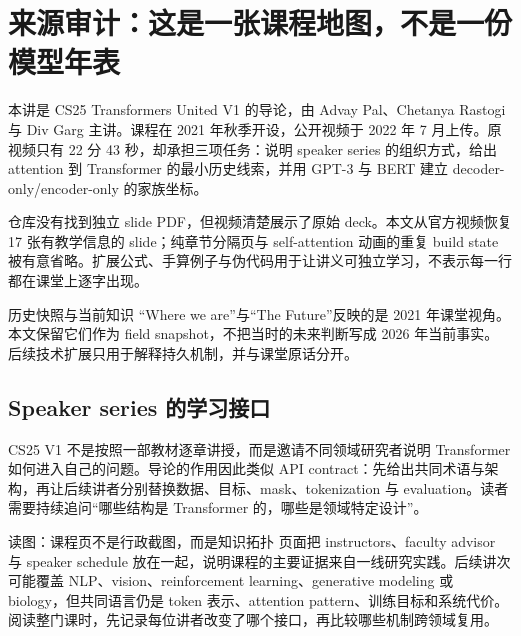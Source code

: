 \section{来源审计：这是一张课程地图，不是一份模型年表}

本讲是 CS25 Transformers United V1 的导论，由 Advay Pal、Chetanya Rastogi 与 Div Garg 主讲。课程在 2021 年秋季开设，公开视频于 2022 年 7 月上传。原视频只有 22 分 43 秒，却承担三项任务：说明 speaker series 的组织方式，给出 attention 到 Transformer 的最小历史线索，并用 GPT-3 与 BERT 建立 decoder-only/encoder-only 的家族坐标。

仓库没有找到独立 slide PDF，但视频清楚展示了原始 deck。本文从官方视频恢复 17 张有教学信息的 slide；纯章节分隔页与 self-attention 动画的重复 build state 被有意省略。扩展公式、手算例子与伪代码用于让讲义可独立学习，不表示每一行都在课堂上逐字出现。

\begin{warningbox}{历史快照与当前知识}
“Where we are”与“The Future”反映的是 2021 年课堂视角。本文保留它们作为 field snapshot，不把当时的未来判断写成 2026 年当前事实。后续技术扩展只用于解释持久机制，并与课堂原话分开。
\end{warningbox}

\subsection{Speaker series 的学习接口}

CS25 V1 不是按照一部教材逐章讲授，而是邀请不同领域研究者说明 Transformer 如何进入自己的问题。导论的作用因此类似 API contract：先给出共同术语与架构，再让后续讲者分别替换数据、目标、mask、tokenization 与 evaluation。读者需要持续追问“哪些结构是 Transformer 的，哪些是领域特定设计”。


\begin{knowledgebox}{读图：课程页不是行政截图，而是知识拓扑}
页面把 instructors、faculty advisor 与 speaker schedule 放在一起，说明课程的主要证据来自一线研究实践。后续讲次可能覆盖 NLP、vision、reinforcement learning、generative modeling 或 biology，但共同语言仍是 token 表示、attention pattern、训练目标和系统代价。阅读整门课时，先记录每位讲者改变了哪个接口，再比较哪些机制跨领域复用。
\end{knowledgebox}


